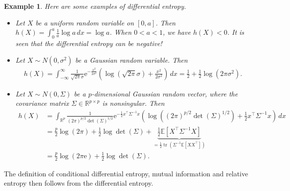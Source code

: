 \documentclass{article}
\numberwithin{equation}{section}
\newcommand{\e}{\mathrm{e}}
\newcommand{\E}{\mathbb{E}}
\newcommand{\bbR}{\mathbb{R}}
\DeclareMathOperator{\tr}{tr}
\theoremstyle{plain}
\newtheorem{example}[theorem]{Example}
\theoremstyle{definition}
\begin{document}
\begin{example} Here are some examples of differential entropy.
\begin{itemize}
\item[(i)] Let $X$ be a uniform random variable on $[0,a]$. Then $h(X)=\int_0^a\frac{1}{a}\log a\,dx=\log a$. When $0<a<1$, we have $h(X)<0$. It is seen that the differential entropy can be negative!
\item[(ii)] Let $X\sim N(0,\sigma^2)$ be a Gaussian random variable. Then
\begin{align*}
	h(X)=\int_{-\infty}^\infty\frac{1}{\sqrt{2\pi}\sigma}\e^{-\frac{x^2}{2\sigma^2}}\left(\log\left(\sqrt{2\pi}\sigma\right)+\frac{x^2}{2\sigma^2}\right)\,dx=\frac{1}{2}+\frac{1}{2}\log\left(2\pi\sigma^2\right).
\end{align*}
\item[(iii)] Let $X\sim N(0,\Sigma)$ be a $p$-dimensional Gaussian random vector, where the covariance matrix $\Sigma\in\bbR^{p\times p}$ is nonsingular. Then
\begin{align*}
	h(X)&=\int_{\bbR^p}\frac{1}{(2\pi)^{p/2}\det(\Sigma)^{1/2}}\e^{-\frac{1}{2}x^\top\Sigma^{-1} x}\left(\log\left((2\pi)^{p/2}\det(\Sigma)^{1/2}\right)+\frac{1}{2}x^\top\Sigma^{-1}x\right)\,dx\\
	&=\frac{p}{2}\log(2\pi)+\frac{1}{2}\log\det(\Sigma)+\underbrace{\frac{1}{2}\E\left[X^\top\Sigma^{-1}X\right]}_{=\frac{1}{2}\tr(\Sigma^{-1}\E\left[XX^\top\right])}\\
	&=\frac{p}{2}\log(2\pi\e)+\frac{1}{2}\log\det(\Sigma).
\end{align*}
\end{itemize}
\end{example}
The definition of conditional differential entropy, mutual information and relative entropy then follows from the differential entropy.
\end{document}
